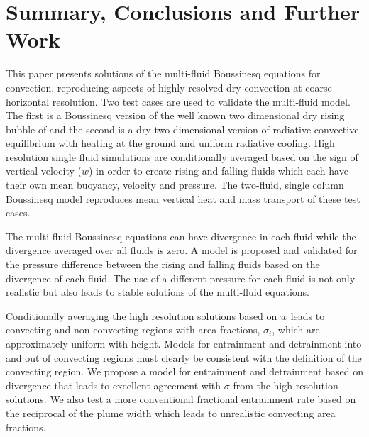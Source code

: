 \documentclass[draft]{agujournal2019}
\begin{document}
\section{Summary, Conclusions and Further Work}

This paper presents solutions of the multi-fluid Boussinesq equations
for convection, reproducing aspects of highly resolved dry convection
at coarse horizontal resolution. Two test cases are used to validate
the multi-fluid model. The first is a Boussinesq version of the well
known two dimensional dry rising bubble of  and the second
is a dry two dimensional version of radiative-convective equilibrium
with heating at the ground and uniform radiative cooling. High resolution
single fluid simulations are conditionally averaged based on the sign
of vertical velocity ($w$) in order to create rising and falling
fluids which each have their own mean buoyancy, velocity and pressure.
The two-fluid, single column Boussinesq model reproduces mean vertical
heat and mass transport of these test cases. 

The multi-fluid Boussinesq equations can have divergence in each fluid
while the divergence averaged over all fluids is zero. A model is
proposed and validated for the pressure difference between the rising
and falling fluids based on the divergence of each fluid. The use
of a different pressure for each fluid is not only realistic but also
leads to stable solutions of the multi-fluid equations. 

Conditionally averaging the high resolution solutions based on $w$
leads to convecting and non-convecting regions with area fractions,
$\sigma_{i}$, which are approximately uniform with height. Models
for entrainment and detrainment into and out of convecting regions
must clearly be consistent with the definition of the convecting region.
We propose a model for entrainment and detrainment based on divergence
that leads to excellent agreement with $\sigma$ from the high resolution
solutions. We also test a more conventional fractional entrainment
rate based on the reciprocal of the plume width which leads to unrealistic
convecting area fractions. 
\end{document}
